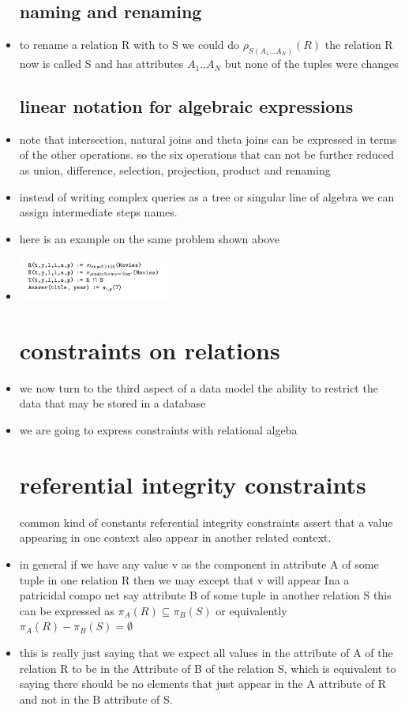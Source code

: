 \documentclass{article}
\begin{document}
\begin{itemize}
\subsection{naming and renaming}
\item to rename a relation R with to S we could do $\rho_{S(A_1...A_N)}(R)$ the relation R now is called S and has attributes $A_1..A_N$ but none of the tuples were changes
\subsection{linear notation for algebraic expressions}
\item note that intersection, natural joins and theta joins can be expressed in terms of the other operations. so the six operations that can not be further reduced as union, difference, selection, projection, product and renaming 
\item instead of writing complex queries as a tree or singular line of algebra we can assign intermediate steps names. 
\item here is an example on the same problem shown above \item \includegraphics[width=5cm]{reading assignment notes/week 1/database systems the complete book chapter 2/assigment_1.jpg}
\section{constraints on relations}
\item we now turn to the third aspect of a data model the ability to restrict the data that may be stored in a database
\item we are going to express constraints with relational algeba
\section{referential integrity constraints}
\itema common kind of constants referential integrity constraints assert that a value appearing in one context also appear in another related context. 
\item in general if we have any value v as the component in attribute A of some tuple in one relation R then we may except that v will appear Ina  a patricidal compo net say attribute B of some tuple in another relation S this can be expressed as $\pi_{A}(R)\subseteq \pi_{B}(S)$ or equivalently $\pi_{A}(R)-\pi_{B}(S)=\emptyset$
\item this is really just saying that we expect all values in the attribute of A of the relation R to be in the Attribute of B of the relation S, which is equivalent to saying there should be no elements that just appear in the A attribute of R and not in the B attribute of S. 

\end{itemize}
\end{document}
